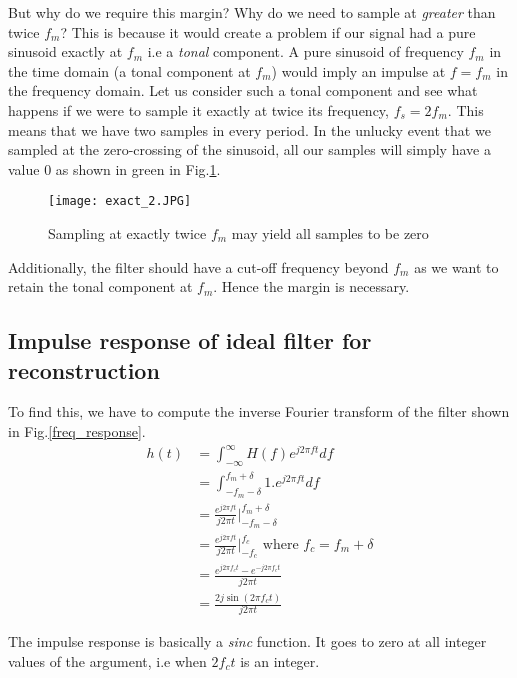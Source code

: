 But why do we require this margin? Why do we need to sample at \textit{greater} than twice $f_{m}$? This is because it would create a problem if our signal had a pure sinusoid exactly at $f_{m}$ i.e a \textit{tonal} component. A pure sinusoid of frequency $f_{m}$ in the time domain (a tonal component at $f_{m}$) would imply an impulse at $f = f_{m}$ in the frequency domain. Let us consider such a tonal component and see what happens if we were to sample it exactly at twice its frequency, $f_{s} = 2f_{m}$. This means that we have two samples in every period. In the unlucky event that we sampled at the zero-crossing of the sinusoid, all our samples will simply have a value $0$ as shown in green in Fig.\ref{exact_2}. 
\begin{figure}[h] 
        \centering
                \texttt{[image: exact\_2.JPG]}
                \caption{Sampling at exactly twice $f_{m}$ may yield all samples to be zero}
                \label{exact_2}
\end{figure}

Additionally, the filter should have a cut-off frequency beyond $f_{m}$ as we want to retain the tonal component at $f_{m}$. Hence the margin is necessary. 

\subsection{Impulse response of ideal filter for reconstruction}
To find this, we have to compute the inverse Fourier transform of the filter shown in Fig.\ref{freq_response}. 
\begin{equation} \label{deriv}
\begin{split}
h(t)   & = \int_{-\infty}^{\infty} H(f)e^{j2\pi ft}df \\
& = \int_{-f_{m}-\delta}^{f_{m}+\delta} 1. e^{j2\pi ft}df \\
& = \frac{e^{j2\pi ft}}{j2\pi t} \rvert_{-f_{m}-\delta}^{f_{m}+\delta} \\
& = \frac{e^{j2\pi ft}}{j2\pi t} \rvert_{-f_{c}}^{f_{c}}  \mbox{ where } f_{c} = f_{m} + \delta \\
& = \frac{e^{j2\pi f_{c}t} - e^{-j2\pi f_{c}t}}{j2\pi t} \\
& = \frac{2j\sin (2\pi f_{c}t)}{j2\pi t} 
\end{split}
\end{equation}

The impulse response is basically a \textit{sinc} function. It goes to zero at all integer values of the argument, i.e when $2f_{c}t$ is an integer. 

